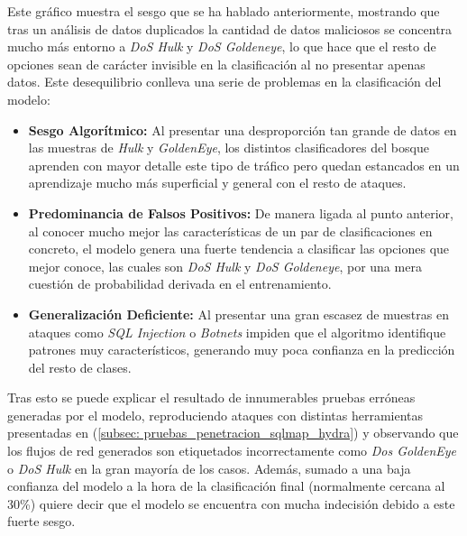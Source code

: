 \documentclass[12pt]{article}
\numberwithin{equation}{section} %
\begin{document}
    \vspace{5mm}

    Este gráfico muestra el sesgo que se ha hablado anteriormente, mostrando que tras un análisis de datos duplicados la cantidad de datos maliciosos se concentra mucho más entorno a \textit{DoS Hulk} y \textit{DoS Goldeneye}, lo que hace que el resto de opciones sean de carácter invisible en la clasificación al no presentar apenas datos. Este desequilibrio conlleva una serie de problemas en la clasificación del modelo:

    \vspace{5mm}

    \begin{itemize}
        \item \textbf{Sesgo Algorítmico:} Al presentar una desproporción tan grande de datos en las muestras de \textit{Hulk} y \textit{GoldenEye}, los distintos clasificadores del bosque aprenden con mayor detalle este tipo de tráfico pero quedan estancados en un aprendizaje mucho más superficial y general con el resto de ataques.
        
        \vspace{2.5mm}

        \item \textbf{Predominancia de Falsos Positivos:} De manera ligada al punto anterior, al conocer mucho mejor las características de un par de clasificaciones en concreto, el modelo genera una fuerte tendencia a clasificar las opciones que mejor conoce, las cuales son \textit{DoS Hulk} y \textit{DoS Goldeneye}, por una mera cuestión de probabilidad derivada en el entrenamiento.
        
        \vspace{2.5mm}

        \item \textbf{Generalización Deficiente:} Al presentar una gran escasez de muestras en ataques como \textit{SQL Injection} o \textit{Botnets} impiden que el algoritmo identifique patrones muy característicos, generando muy poca confianza en la predicción del resto de clases.
    \end{itemize}

    \vspace{5mm}

    Tras esto se puede explicar el resultado de innumerables pruebas erróneas generadas por el modelo, reproduciendo ataques con distintas herramientas presentadas en (\ref{subsec: pruebas_penetracion_sqlmap_hydra}) y observando que los flujos de red generados son etiquetados incorrectamente como \textit{Dos GoldenEye} o \textit{DoS Hulk} en la gran mayoría de los casos. Además, sumado a una baja confianza del modelo a la hora de la clasificación final  (normalmente cercana al 30\%) quiere decir que el modelo se encuentra con mucha indecisión debido a este fuerte sesgo.
\end{document}
